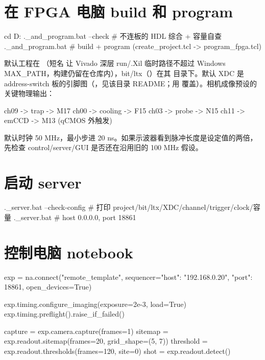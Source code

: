 \documentclass[11pt,oneside,openany]{book}
\begin{document}

\section{在 FPGA 电脑 build 和 program}
\begin{codeblock}[PowerShell]
cd D:\ZLC
.\fpga\build_and_program.bat --check    # 不连板的 HDL 综合 + 容量自查
.\fpga\build_and_program.bat            # build + program (create_project.tcl -> program_fpga.tcl)
\end{codeblock}

默认工程在 （短名  让 Vivado 深层 run/.Xil 临时路径不超过 Windows MAX\_PATH，构建仍留在仓库内），bit/ltx（）在其  目录下。默认 XDC 是 address-switch 板的引脚图（，见该目录 README；用  覆盖）。相机成像预设的关键物理输出：

\begin{codeblock}
ch09 -> trap    -> M17
ch00 -> cooling -> F15
ch03 -> probe   -> N15
ch11 -> emCCD   -> M13   (qCMOS 外触发)
\end{codeblock}

默认时钟 50 MHz，最小步进 20 ns。如果示波器看到脉冲长度是设定值的两倍，先检查 control/server/GUI 是否还在沿用旧的 100 MHz 假设。

\section{启动 server}
\begin{codeblock}[PowerShell]
.\fpga\run_server.bat --check-config    # 打印 project/bit/ltx/XDC/channel/trigger/clock/容量
.\fpga\run_server.bat                    # host 0.0.0.0, port 18861
\end{codeblock}

\section{控制电脑 notebook}
\begin{codeblock}[Python]
exp = na.connect("remote_template",
                 sequencer={"host": "192.168.0.20", "port": 18861},
                 open_devices=True)

exp.timing.configure_imaging(exposure=2e-3, load=True)
exp.timing.preflight().raise_if_failed()

capture   = exp.camera.capture(frames=1)
sitemap   = exp.readout.sitemap(frames=20, grid_shape=(5, 7))
threshold = exp.readout.thresholds(frames=120, site=0)
shot      = exp.readout.detect()
\end{codeblock}
\end{document}
